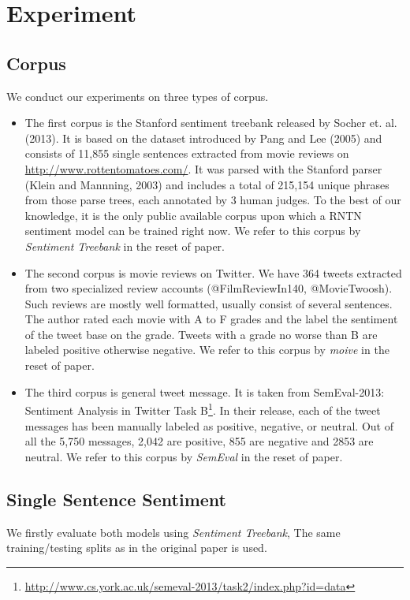 \newpage
\section{Experiment}
\label{sec:exp}


\subsection{Corpus}
We conduct our experiments on three types of corpus.
\begin{itemize}
\item  The first corpus is the Stanford sentiment treebank released by Socher et. al. (2013). It is based on the dataset introduced by Pang and Lee (2005) and consists of 11,855 single sentences extracted from movie reviews on \url{http://www.rottentomatoes.com/}. It was parsed with the Stanford parser (Klein and Mannning, 2003) and includes a total of 215,154 unique phrases from those parse trees, each annotated by 3 human judges. To the best of our knowledge, it is the only public available corpus upon which a RNTN sentiment model can be trained right now. We refer to this corpus by \textit{Sentiment Treebank} in the reset of paper. 

\item  The second corpus is movie reviews on Twitter. We have 364 tweets extracted from two specialized review accounts (@FilmReviewIn140, @MovieTwoosh). Such reviews are mostly well formatted, usually consist of several sentences. The author rated each movie with A to F grades and the label the sentiment of the tweet base on the grade. Tweets with a grade no worse than B are labeled positive otherwise negative.  We refer to this corpus by \textit{moive} in the reset of paper. 

\item The third corpus is general tweet message. It is taken from SemEval-2013: Sentiment Analysis in Twitter Task B\footnote{\url{http://www.cs.york.ac.uk/semeval-2013/task2/index.php?id=data}}. In their release, each of the tweet messages has been manually labeled as positive, negative, or neutral. Out of all the 5,750 messages, 2,042 are positive, 855 are negative and 2853 are neutral.  We refer to this corpus by \textit{SemEval} in the reset of paper. 
\end{itemize}

\subsection{Single Sentence Sentiment}
We firstly evaluate both models using \textit{Sentiment Treebank}, The same training/testing splits as in the original paper\cite{Socher:2013} is used. 

